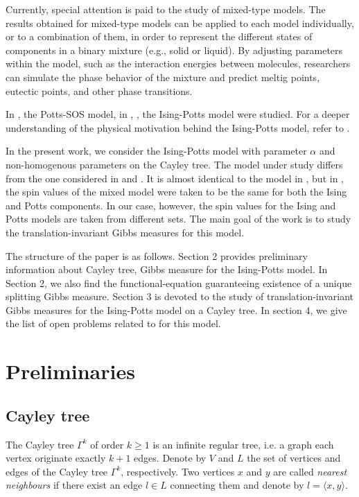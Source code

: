 \documentclass[sn-mathphys]{sn-jnl}%
\theoremstyle{thmstyleone}%
\theoremstyle{thmstyletwo}%
\theoremstyle{thmstylethree}%
\begin{document}
Currently, special attention is paid to the study of mixed-type models. The results obtained for mixed-type models can be applied to each model individually, or to a combination of them, in order to represent the different states of components in a binary mixture (e.g., solid or liquid). By adjusting parameters within the model, such as the interaction energies between molecules, researchers can simulate the phase behavior of the mixture and predict meltig points, eutectic points, and other phase transitions.

In \cite{S16}, \cite{RR21} the Potts-SOS model, in \cite{Mc89}, \cite{RI24}, \cite{HOR25} the Ising-Potts model were studied. For a deeper understanding of the physical motivation behind the Ising-Potts model, refer to \cite{Mc89}.

In the present work, we consider the Ising-Potts model with parameter $\alpha$ and non-homogenous parameters on the Cayley tree. The model under study differs from the one considered in \cite{Mc89} and \cite{HOR25}. It is almost identical to the model in \cite{RI24}, but in \cite{RI24}, the spin values of the mixed model were taken to be the same for both the Ising and Potts components. In our case, however, the spin values for the Ising and Potts models are taken from different sets. The main goal of the work is to study the translation-invariant Gibbs measures for this model.

The structure of the paper is as follows. Section 2 provides preliminary information about Cayley tree, Gibbs measure for the Ising-Potts model.  In Section 2, we also find the functional-equation guaranteeing existence of a unique splitting Gibbs measure. Section 3 is devoted to the study of translation-invariant Gibbs measures for the Ising-Potts model on a Cayley tree. In section 4, we give the list of open problems related to for this model.

\section{Preliminaries}

\subsection{Cayley tree}
The Cayley tree $\Gamma ^{k}$ of order $k\geq1$ is an infinite regular tree, i.e. a graph each vertex originate exactly $k+1$ edges. Denote by $V$ and $L$ the set of vertices and edges of the Cayley tree $\Gamma ^{k}$, respectively. Two vertices $x$ and $y$ are called
\emph{nearest neighbours} if there exist an edge $l \in L$
connecting them and denote by $l = \langle x, y\rangle.$
\end{document}
